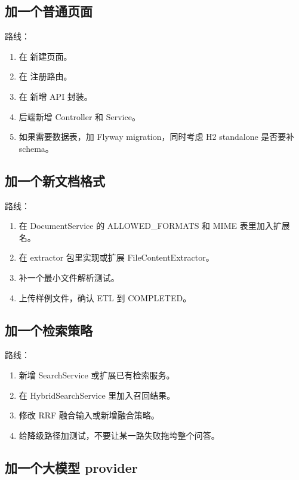 \documentclass[UTF8,zihao=-4]{ctexart}
\begin{document}
\subsection{加一个普通页面}

路线：

\begin{enumerate}
  \item 在  新建页面。
  \item 在  注册路由。
  \item 在  新增 API 封装。
  \item 后端新增 Controller 和 Service。
  \item 如果需要数据表，加 Flyway migration，同时考虑 H2 standalone 是否要补 schema。
\end{enumerate}

\subsection{加一个新文档格式}

路线：

\begin{enumerate}
  \item 在 DocumentService 的 ALLOWED\_FORMATS 和 MIME 表里加入扩展名。
  \item 在 extractor 包里实现或扩展 FileContentExtractor。
  \item 补一个最小文件解析测试。
  \item 上传样例文件，确认 ETL 到 COMPLETED。
\end{enumerate}

\subsection{加一个检索策略}

路线：

\begin{enumerate}
  \item 新增 SearchService 或扩展已有检索服务。
  \item 在 HybridSearchService 里加入召回结果。
  \item 修改 RRF 融合输入或新增融合策略。
  \item 给降级路径加测试，不要让某一路失败拖垮整个问答。
\end{enumerate}

\subsection{加一个大模型 provider}
\end{document}
